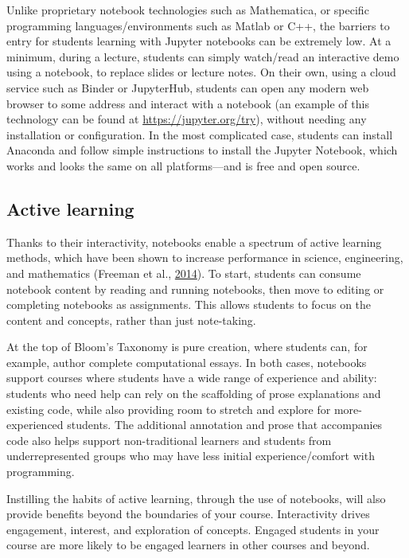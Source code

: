 \documentclass[]{book}
\begin{document}
Unlike proprietary notebook technologies such as Mathematica, or specific
programming languages/environments such as Matlab or C++, the barriers to entry
for students learning with Jupyter notebooks can be extremely low. At a minimum,
during a lecture, students can simply watch/read an interactive demo using a
notebook, to replace slides or lecture notes. On their own, using a cloud
service such as Binder or JupyterHub, students can open any modern web browser
to some address and interact with a notebook (an example of this technology can
be found at \url{https://jupyter.org/try}), without
needing any installation or configuration. In the most complicated case,
students can install Anaconda and follow simple instructions to install the
Jupyter Notebook, which works and looks the same on all platforms---and is free
and open source.

\hypertarget{active-learning}{%
\subsection{Active learning}\label{active-learning}}

Thanks to their interactivity, notebooks enable a spectrum of active learning
methods, which have been shown to increase performance in science, engineering,
and mathematics (Freeman et al., \protect\hyperlink{ref-freeman2014active}{2014}). To start, students can consume notebook
content by reading and running notebooks, then move to editing or completing
notebooks as assignments. This allows students to focus on the content and
concepts, rather than just note-taking.

At the top of Bloom's Taxonomy is pure creation, where students can, for
example, author complete computational essays. In both cases, notebooks support
courses where students have a wide range of experience and ability: students who
need help can rely on the scaffolding of prose explanations and existing code,
while also providing room to stretch and explore for more-experienced students.
The additional annotation and prose that accompanies code also helps support
non-traditional learners and students from underrepresented groups who may have
less initial experience/comfort with programming.

Instilling the habits of active learning, through the use of notebooks, will
also provide benefits beyond the boundaries of your course. Interactivity drives
engagement, interest, and exploration of concepts. Engaged students in your
course are more likely to be engaged learners in other courses and beyond.
\end{document}
